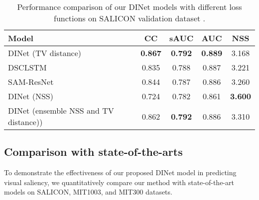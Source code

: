 \begin{table}[]
	\centering
	\scriptsize
	\caption{Performance comparison of our DINet models with different loss functions on SALICON validation dataset \cite{jiang2015salicon}.}
	\label{table:lossen}
	\begin{tabular}{|l|cccc|}
		\hline
		Model                                & CC    & sAUC  & AUC   & NSS   \\ \hline 
		DINet (TV distance)                  & \textbf{0.867} & \textbf{0.792} & \textbf{0.889} & 3.168 \\ \hline 
		DSCLSTM     \cite{liu2016deep}                         & 0.835 & 0.788 & 0.887 & 3.221 \\ \hline
		SAM-ResNet  \cite{cornia2016predicting}                         & 0.844 & 0.787 & 0.886 & 3.260  \\ \hline 
		DINet (NSS)                           & 0.724 & 0.782 & 0.861 & \textbf{3.600}   \\ \hline 
		DINet (ensemble NSS and TV distance)) & 0.862 & \textbf{0.792} & 0.886 & 3.310  \\ \hline 
	\end{tabular}
\vspace{-4mm}
\end{table}


\subsection{Comparison with state-of-the-arts}

To demonstrate the effectiveness of our proposed DINet model in predicting visual saliency, we quantitatively compare our method with state-of-the-art models on SALICON, MIT1003, and MIT300 datasets. 




